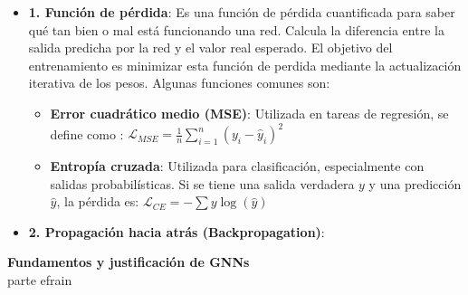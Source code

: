 \documentclass[11pt]{article} %
\begin{document}
\begin{itemize}
\item\textbf{1. Función de pérdida}:\newline
Es una función de pérdida cuantificada para saber qué tan bien o mal está funcionando una red. Calcula la diferencia entre la salida predicha por la red y el valor real esperado. El objetivo del entrenamiento es minimizar esta función de perdida mediante la actualización iterativa de los pesos. \newline Algunas funciones comunes son:
\begin{itemize}
    \item \textbf{Error cuadrático medio (MSE)}: Utilizada en tareas de regresión, se define como : $\mathcal{L}_{MSE} = \frac{1}{n} \sum_{i=1}^{n}(y_i - \hat{y}_i)^2$
    \item \textbf{Entropía cruzada}: Utilizada para clasificación, especialmente con salidas probabilísticas. Si se tiene una salida verdadera $y$ y una predicción $\hat{y}$, la pérdida es: $\mathcal{L}_{CE} = -\sum y \log(\hat{y})$
\end{itemize}

\item\textbf{2. Propagación hacia atrás (Backpropagation)}:\newline

\end{itemize}

\newpage
\thispagestyle{empty}
{\large \textbf{Fundamentos y justificación de GNNs}} \vspace{5pt}
\\
parte efrain

\newpage
\nocite{*}
\printbibliography
\end{document}

